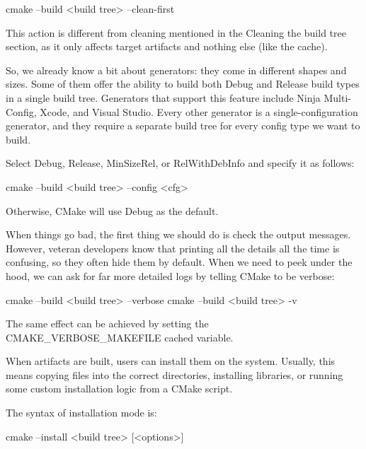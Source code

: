 \begin{shell}
cmake --build <build tree> --clean-first
\end{shell}

This action is different from cleaning mentioned in the Cleaning the build tree section, as it only affects target artifacts and nothing else (like the cache).


So, we already know a bit about generators: they come in different shapes and sizes. Some of them offer the ability to build both Debug and Release build types in a single build tree. Generators that support this feature include Ninja Multi-Config, Xcode, and Visual Studio. Every other generator is a single-configuration generator, and they require a separate build tree for every config type we want to build.

Select Debug, Release, MinSizeRel, or RelWithDebInfo and specify it as follows:

\begin{shell}
cmake --build <build tree> --config <cfg>
\end{shell}

Otherwise, CMake will use Debug as the default.


When things go bad, the first thing we should do is check the output messages. However, veteran developers know that printing all the details all the time is confusing, so they often hide them by default. When we need to peek under the hood, we can ask for far more detailed logs by telling CMake to be verbose:

\begin{shell}
cmake --build <build tree> --verbose
cmake --build <build tree> -v
\end{shell}

The same effect can be achieved by setting the CMAKE\_VERBOSE\_MAKEFILE cached variable.


When artifacts are built, users can install them on the system. Usually, this means copying files into the correct directories, installing libraries, or running some custom installation logic from a CMake script.

The syntax of installation mode is:

\begin{shell}
cmake --install <build tree> [<options>]
\end{shell}

